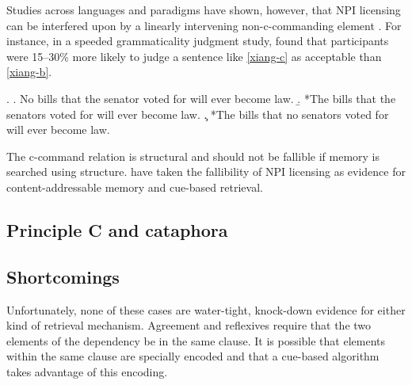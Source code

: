 Studies across languages and paradigms have shown, however, that NPI licensing can be interfered upon by a linearly intervening non-c-commanding element \citep[][et seq.]{drenhaus05}. For instance, in a speeded grammaticality judgment study, \citet{xiang06} found that participants were 15--30\% more likely to judge a sentence like \ref{xiang-c} as acceptable than \ref{xiang-b}.

\ex. \a. No bills that the senator voted for will ever become law.    \label{xiang-a}
     \b. *The bills that the senators voted for will ever become law. \label{xiang-b}
     \c. *The bills that no senators voted for will ever become law.  \label{xiang-c}


The c-command relation is structural and should not be fallible if memory is searched using structure. \citet{vasishth08} have taken the fallibility of NPI licensing as evidence for content-addressable memory and cue-based retrieval.

\subsection{Principle C and cataphora}



\subsection{Shortcomings}

Unfortunately, none of these cases are water-tight, knock-down evidence for either kind of retrieval mechanism. Agreement and reflexives require that the two elements of the dependency be in the same clause. It is possible that elements within the same clause are specially encoded and that a cue-based algorithm takes advantage of this encoding.